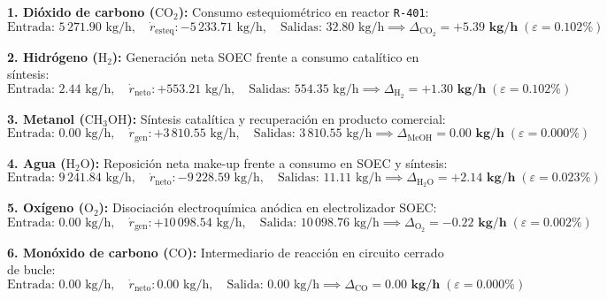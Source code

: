 \documentclass[11pt,letterpaper]{article}
\begin{document}
\noindent\textbf{1. Dióxido de carbono ($\text{CO}_2$):} Consumo estequiométrico en reactor \texttt{R-401}:
\begin{equation*}
\text{Entrada: } 5\,271.90\text{ kg/h}, \quad \dot{r}_{\text{esteq}}: -5\,233.71\text{ kg/h}, \quad \text{Salidas: } 32.80\text{ kg/h} \implies \Delta_{\text{CO}_2} = \mathbf{+5.39\text{ kg/h}} \; (\varepsilon = \mathbf{0.102\%})
\end{equation*}

\noindent\textbf{2. Hidrógeno ($\text{H}_2$):} Generación neta SOEC frente a consumo catalítico en síntesis:
\begin{equation*}
\text{Entrada: } 2.44\text{ kg/h}, \quad \dot{r}_{\text{neto}}: +553.21\text{ kg/h}, \quad \text{Salidas: } 554.35\text{ kg/h} \implies \Delta_{\text{H}_2} = \mathbf{+1.30\text{ kg/h}} \; (\varepsilon = \mathbf{0.102\%})
\end{equation*}

\noindent\textbf{3. Metanol ($\text{CH}_3\text{OH}$):} Síntesis catalítica y recuperación en producto comercial:
\begin{equation*}
\text{Entrada: } 0.00\text{ kg/h}, \quad \dot{r}_{\text{gen}}: +3\,810.55\text{ kg/h}, \quad \text{Salidas: } 3\,810.55\text{ kg/h} \implies \Delta_{\text{MeOH}} = \mathbf{0.00\text{ kg/h}} \; (\varepsilon = \mathbf{0.000\%})
\end{equation*}

\noindent\textbf{4. Agua ($\text{H}_2\text{O}$):} Reposición neta make-up frente a consumo en SOEC y síntesis:
\begin{equation*}
\text{Entrada: } 9\,241.84\text{ kg/h}, \quad \dot{r}_{\text{neto}}: -9\,228.59\text{ kg/h}, \quad \text{Salidas: } 11.11\text{ kg/h} \implies \Delta_{\text{H}_2\text{O}} = \mathbf{+2.14\text{ kg/h}} \; (\varepsilon = \mathbf{0.023\%})
\end{equation*}

\noindent\textbf{5. Oxígeno ($\text{O}_2$):} Disociación electroquímica anódica en electrolizador SOEC:
\begin{equation*}
\text{Entrada: } 0.00\text{ kg/h}, \quad \dot{r}_{\text{gen}}: +10\,098.54\text{ kg/h}, \quad \text{Salida: } 10\,098.76\text{ kg/h} \implies \Delta_{\text{O}_2} = \mathbf{-0.22\text{ kg/h}} \; (\varepsilon = \mathbf{0.002\%})
\end{equation*}

\noindent\textbf{6. Monóxido de carbono ($\text{CO}$):} Intermediario de reacción en circuito cerrado de bucle:
\begin{equation*}
\text{Entrada: } 0.00\text{ kg/h}, \quad \dot{r}_{\text{neto}}: 0.00\text{ kg/h}, \quad \text{Salida: } 0.00\text{ kg/h} \implies \Delta_{\text{CO}} = \mathbf{0.00\text{ kg/h}} \; (\varepsilon = \mathbf{0.000\%})
\end{equation*}
\end{document}
